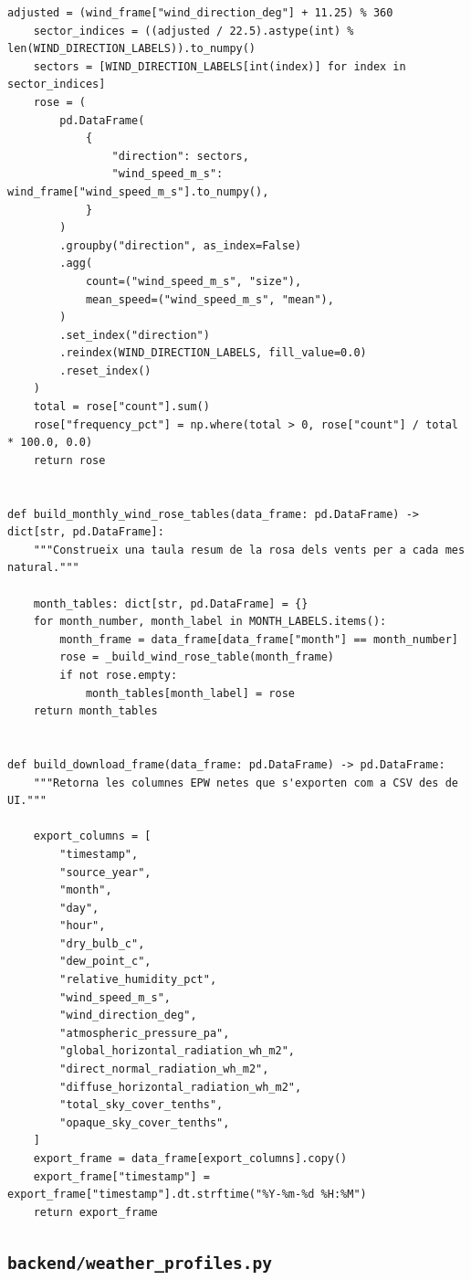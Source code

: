 \documentclass[10pt,a4paper]{article}
\begin{document}
\begin{lstlisting}[style=studioPython,caption={backend/visor\_epw\_backend.py},label={lst:backend-visor-epw-backend-py}]
    adjusted = (wind_frame["wind_direction_deg"] + 11.25) % 360
    sector_indices = ((adjusted / 22.5).astype(int) % len(WIND_DIRECTION_LABELS)).to_numpy()
    sectors = [WIND_DIRECTION_LABELS[int(index)] for index in sector_indices]
    rose = (
        pd.DataFrame(
            {
                "direction": sectors,
                "wind_speed_m_s": wind_frame["wind_speed_m_s"].to_numpy(),
            }
        )
        .groupby("direction", as_index=False)
        .agg(
            count=("wind_speed_m_s", "size"),
            mean_speed=("wind_speed_m_s", "mean"),
        )
        .set_index("direction")
        .reindex(WIND_DIRECTION_LABELS, fill_value=0.0)
        .reset_index()
    )
    total = rose["count"].sum()
    rose["frequency_pct"] = np.where(total > 0, rose["count"] / total * 100.0, 0.0)
    return rose


def build_monthly_wind_rose_tables(data_frame: pd.DataFrame) -> dict[str, pd.DataFrame]:
    """Construeix una taula resum de la rosa dels vents per a cada mes natural."""

    month_tables: dict[str, pd.DataFrame] = {}
    for month_number, month_label in MONTH_LABELS.items():
        month_frame = data_frame[data_frame["month"] == month_number]
        rose = _build_wind_rose_table(month_frame)
        if not rose.empty:
            month_tables[month_label] = rose
    return month_tables


def build_download_frame(data_frame: pd.DataFrame) -> pd.DataFrame:
    """Retorna les columnes EPW netes que s'exporten com a CSV des de UI."""

    export_columns = [
        "timestamp",
        "source_year",
        "month",
        "day",
        "hour",
        "dry_bulb_c",
        "dew_point_c",
        "relative_humidity_pct",
        "wind_speed_m_s",
        "wind_direction_deg",
        "atmospheric_pressure_pa",
        "global_horizontal_radiation_wh_m2",
        "direct_normal_radiation_wh_m2",
        "diffuse_horizontal_radiation_wh_m2",
        "total_sky_cover_tenths",
        "opaque_sky_cover_tenths",
    ]
    export_frame = data_frame[export_columns].copy()
    export_frame["timestamp"] = export_frame["timestamp"].dt.strftime("%Y-%m-%d %H:%M")
    return export_frame
\end{lstlisting}


\subsection{\texorpdfstring{\texttt{backend/weather\_profiles.py}}{backend/weather\_profiles.py}}
\end{document}
